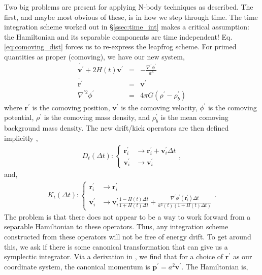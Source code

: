 Two big problems are present for applying N-body techniques as described. The first, and maybe most obvious of these, is in how we step through time. The time integration scheme worked out in \S\ref{ssec:time_int} makes a critical assumption: the Hamiltonian and its separable components are time independent! Eq. \eqref{eq:comoving_dist} forces us to re-express the leapfrog scheme. For primed quantities as proper (comoving), we have  our new system\citep{quinn_1997},
\begin{eqnarray}
\dot{\textbf{v}^\prime} + 2 H(t) \textbf{v}^\prime &=& -\frac{\nabla^\prime \phi^\prime}{a^3}\\
\dot{\textbf{r}^\prime} &=& \textbf{v}^\prime\\
\nabla^{\prime 2} \phi^\prime &=& 4 \pi G \left(\rho^\prime - \rho_b^\prime \right)
\end{eqnarray}
where $\textbf{r}^\prime$ is the comoving position, $\textbf{v}^\prime$ is the comoving velocity, $\phi^\prime$ is the comoving potential, $\rho^\prime$ is the comoving mass density, and $\rho_b^\prime$ is the mean comoving background mass density. The new drift/kick operators are then defined implicitly \citep{quinn_1997},
\begin{eqnarray}
D_t(\Delta t) : \begin{cases} 
	  \textbf{r}^\prime_i & \longrightarrow  \textbf{r}^\prime_i + \textbf{v}^\prime_i \Delta t\\
      \textbf{v}^\prime_i & \longrightarrow  \textbf{v}^\prime_i 
   \end{cases},
\end{eqnarray}
and,
\begin{eqnarray}
K_t(\Delta t) : \begin{cases} 
	  \textbf{r}^\prime_i & \longrightarrow  \textbf{r}^\prime_i\\
      \textbf{v}^\prime_i & \longrightarrow  \textbf{v}^\prime_i \frac{1 - H(t) \Delta t}{1 + H(t) \Delta t} + \frac{\nabla^\prime \phi^\prime(\textbf{r}^\prime_i) \Delta t}{a^3(t) \left(1 + H(t) \Delta t \right)}
   \end{cases}.
\end{eqnarray}
The problem is that there does not appear to be a way to work forward from a separable Hamiltonian to these operators. Thus, any integration scheme constructed from these operators will not be free of energy drift. To get around this, we ask if there is some canonical transformation that can give us a symplectic integrator. Via a derivation in \citet{quinn_1997}, we find that for a choice of $\textbf{r}^\prime$ as our coordinate system, the canonical momentum is $\textbf{p}^\prime = a^2 \textbf{v}^\prime$. The Hamiltonian is,
